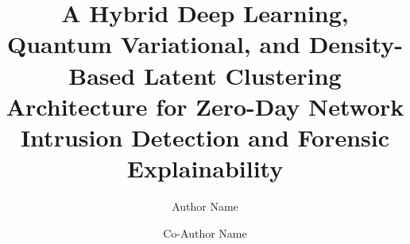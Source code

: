 \documentclass[preprint,12pt]{elsarticle}
\begin{document}
\begin{frontmatter}

\title{A Hybrid Deep Learning, Quantum Variational, and Density-Based Latent Clustering Architecture for Zero-Day Network Intrusion Detection and Forensic Explainability}

\author[inst1]{Author Name}
\author[inst1]{Co-Author Name}



\begin{abstract}

\end{abstract}
\end{frontmatter}
\end{document}
